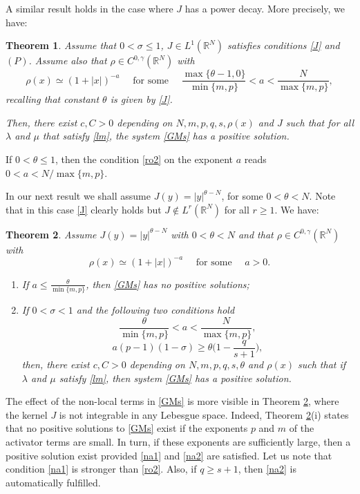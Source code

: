 \documentclass[leqno,12pt]{article}
\newcommand{\R}{\mathbb R}
\newtheorem{theorem}{Theorem}[section]
\numberwithin{equation}{section}
\begin{document}
A similar result holds in the case where $J$ has a power decay. More precisely, we have:
\begin{theorem}\label{thp}
Assume that $0<\sigma\leq 1$,  $J\in L^1(\R^N)$  satisfies conditions \eqref{J} and  $(P)$. Assume also that
$\rho\in C^{0,\gamma}(\R^N)$ with
\begin{equation}\label{ro2}
\rho(x)\simeq (1+|x|)^{-a}\quad\mbox{ for some }\quad    \frac{\max\{\theta-1, 0\}}{\min\{m,p\}}<a< \frac{N}{\max\{m,p\}}, 
\end{equation} 
recalling that constant $\theta$ is given by  \eqref{J}.

Then, there exist $c,C>0$ depending on $N, m,p,q,s,\rho(x)$ and $J$ such that for all $\lambda$ and $\mu$ that satisfy \eqref{lm}, 
the system \eqref{GMs} has a positive solution.  
\end{theorem}
If $0<\theta\leq 1$, then the condition \eqref{ro2} on the exponent $a$ reads $0<a<N/\max\{m,p\}$.

In our next result we shall assume $J(y)=|y|^{\theta-N}$, for some $0<\theta<N$. Note that in this case \eqref{J} clearly holds but $J\not\in L^r(\R^N)$ for all $r\geq 1$. We have:

\begin{theorem}\label{thl}
Assume $J(y)=|y|^{\theta-N}$ with $0<\theta<N$ and that
$\rho\in C^{0,\gamma}(\R^N)$ with
\begin{equation}\label{ro3}
\rho(x)\simeq (1+|x|)^{-a}\quad\mbox{ for some }\quad  a> 0.
\end{equation} 
\begin{enumerate}
\item[{\rm (i)}] If $\displaystyle a\le\frac{\theta}{\min\{m,p\}}$, then \eqref{GMs} has no positive solutions;

\item[{\rm (ii)}] If $0<\sigma< 1$ and the following two conditions hold 
\begin{equation}\label{na1}
\frac{\theta}{\min\{ m, p\}}<a<\frac{N}{\max\{ m, p\}},
\end{equation}
\begin{equation}\label{na2}
a(p-1)(1-\sigma)\geq \theta\Big(1-\frac{q}{s+1}\Big),  
\end{equation}
then, there exist $c,C>0$ depending on $N, m,p,q,s, \theta$ and $\rho(x)$ such that if $\lambda$ and $\mu$ satisfy \eqref{lm}, 
then system \eqref{GMs} has a positive solution.  
\end{enumerate}
\end{theorem}
The effect of the non-local terms in \eqref{GMs} is more visible in Theorem \ref{thl}, where the kernel $J$ is not integrable in any Lebesgue space. Indeed, Theorem \ref{thl}(i) states that no positive solutions to \eqref{GMs} exist if the exponents $p$ and $m$ of the activator terms are  small. In turn, if these exponents are sufficiently large, then a positive solution exist provided \eqref{na1} and \eqref{na2} are satisfied. Let us note that condition \eqref{na1} is stronger than \eqref{ro2}. Also,  if $q\geq s+1$, then \eqref{na2} is automatically fulfilled.
\end{document}
